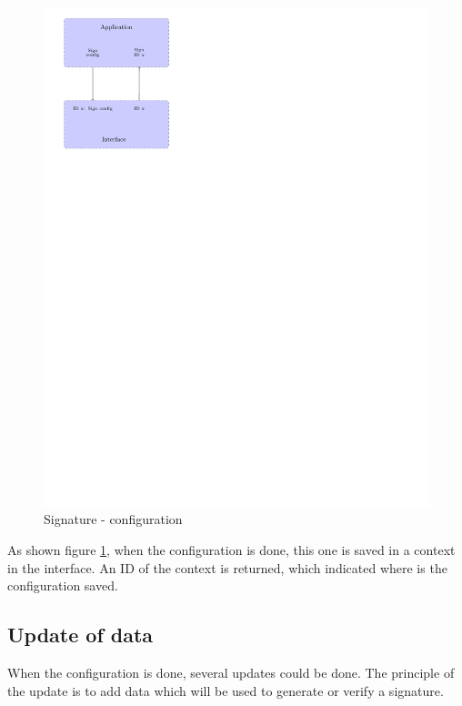 \begin{figure}[!ht]
\centering
\includegraphics[trim=0cm 20cm 9.5cm 0cm]{figures/sign_example_config.pdf}
\caption{Signature - configuration\newline}
\label{fig:gci_sign_config}
\end{figure}

As shown figure \ref{fig:gci_sign_config}, when the configuration is done, this
one is saved in a context in the interface. An ID of the context is returned,
which indicated where is the configuration saved.

\subsection*{Update of data} 

When the configuration is done, several updates could be done.\newline
The principle of the update is to add data which will be used to generate or
verify a signature.\newline

